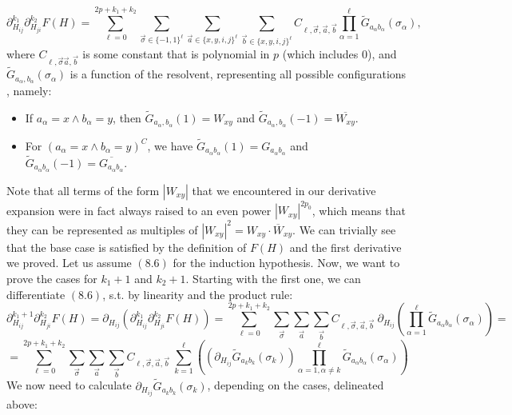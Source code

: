 \documentclass[11pt]{article}
\begin{document}
\begin{equation*}
\partial_{H_{ij}}^{k_1}\partial_{H_{ji}}^{k_2} F(H)= \sum_{\ell=0}^{2p+k_1+k_2} \sum_{\vec\sigma\in \{-1,1\}^\ell}\sum_{\vec a\in \{x, y, i, j\}^\ell}\sum_{\vec b\in \{x, y, i, j\}^\ell} C_{\ell, \vec \sigma, \vec a, \vec b} \prod_{\alpha=1}^\ell \tilde{G}_{a_\alpha b_\alpha}(\sigma_\alpha)\tag{8.6},
\end{equation*}
where $C_{\ell, \vec \sigma \vec a, \vec b}$ is some constant that is polynomial in $p$ (which includes $0$), and $\tilde{G}_{a_\alpha,b_\alpha}(\sigma_\alpha)$ is a function of the resolvent, representing all possible configurations , namely: 
\begin{itemize}
\item If $a_\alpha=x \wedge b_\alpha=y$, then $\tilde{G}_{a_\alpha, b_\alpha}(1) = W_{xy}$ and  $\tilde{G}_{a_\alpha, b_\alpha}(-1) = \overline{W_{xy}}$.
\item For $(a_\alpha=x\wedge b_\alpha=y)^C$, we have $\tilde G_{a_\alpha b_\alpha}(1) = G_{a_\alpha b_\alpha}$ and $\tilde G_{a_\alpha b_\alpha}(-1) = \overline{G_{a_\alpha b_\alpha}}$.
 \end{itemize}
Note that all terms of the form $|W_{xy}|$ that we encountered in our derivative expansion were in fact always raised to an even power $|W_{xy}|^{2p_0}$, which means that they can be represented as multiples of $|W_{xy}|^{2} = W_{xy}\cdot \overline{W}_{xy}$.  We can trivially see that the base case is satisfied by the definition of $F(H)$ and the first derivative we proved. Let us assume $(8.6)$ for the induction hypothesis. Now, we want to prove the cases for $k_1+1$ and $k_2+1$. Starting with the first one, we can differentiate $(8.6)$, s.t. by linearity and the product rule: $$\partial_{H_{ij}}^{k_1+1}\partial_{H_{ji}}^{k_2} F(H) = \partial_{H_{ij}}\left(\partial_{H_{ij}}^{k_1}\partial_{H_{ji}}^{k_2} F(H)\right) = \sum_{\ell=0}^{2p+k_1+k_2} \sum_{\vec\sigma}\sum_{\vec a}\sum_{\vec b} C_{\ell, \vec \sigma, \vec a, \vec b}\  \partial_{H_{ij}}\left(\prod_{\alpha=1}^\ell \tilde{G}_{a_\alpha b_\alpha}(\sigma_\alpha)\right)=$$
$$=\sum_{\ell=0}^{2p+k_1+k_2} \sum_{\vec\sigma}\sum_{\vec a}\sum_{\vec b}C_{\ell, \vec \sigma, \vec a, \vec b}\ \sum_{k=1}^\ell \left(\left(\partial_{H_{ij}}\tilde{G}_{a_k b_k}(\sigma_k)\right) \prod_{\alpha=1,\alpha\neq k}^\ell \tilde{G}_{a_\alpha b_\alpha}(\sigma_\alpha)\right) $$
We now need to calculate $\partial_{H_{ij}}\tilde{G}_{a_k b_k}(\sigma_k)$, depending on the cases, delineated above:
\end{document}
